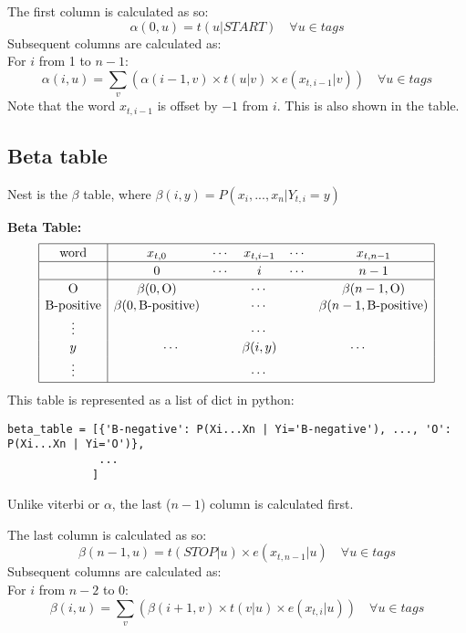 \documentclass[12pt]{article}
\begin{document}
The first column is calculated as so:
\[ \alpha(0,u) = t(u|START) \quad \forall u \in {tags}\]
Subsequent columns are calculated as:\\
For \(i\) from 1 to \(n-1\):
\[ \alpha(i,u) = \sum_v \left( \alpha(i-1,v) \times t(u|v) \times e(x_{t,i-1}|v) \right) \quad \forall u \in {tags}\]
Note that the word \(x_{t,i-1}\) is offset by \(-1\) from \(i\). This is also shown in the table.

\subsection{Beta table}
Nest is the \(\beta\) table, where \(\beta(i,y) = P(x_i,...,x_n | Y_{t,i}=y) \)

\textbf{Beta Table:}
\[
\begin{array}{|c|ccccc|}
\hline \rule{0pt}{1em}
\mbox{word} & x_{t,0} & \cdots & x_{t,i-1} & \cdots & x_{t,n-1} \\
\hline \rule{0pt}{1em}
& 0 & \cdots & i & \cdots & n-1 \\
\hline \rule{0pt}{1em}
\mbox{O}          & \beta(0,\mbox{O}) & \multicolumn{3}{c}{\cdots} & \beta(n-1,\mbox{O}) \\[0.1em]
\mbox{B-positive} & \beta(0,\mbox{B-positive}) & \multicolumn{3}{c}{\cdots} & \beta(n-1,\mbox{B-positive}) \\[0.1em]
\vdots &          & \multicolumn{3}{c}{\cdots} &            \\[0.1em]
y      & \multicolumn{2}{c}{\cdots} & \beta(i,y) & \multicolumn{2}{c|}{\cdots} \\[0.1em]
\vdots &          & \multicolumn{3}{c}{\cdots} &            \\[0.1em]
\hline
\end{array}
\]
This table is represented as a list of dict in python:
\begin{verbatim}
beta_table = [{'B-negative': P(Xi...Xn | Yi='B-negative'), ..., 'O': P(Xi...Xn | Yi='O')},
              ...
             ]
\end{verbatim}

Unlike viterbi or \(\alpha\), the last (\(n-1\)) column is calculated first.

The last column is calculated as so:
\[ \beta(n-1,u) = t(STOP|u) \times e(x_{t,n-1}|u) \quad \forall u \in {tags}\]
Subsequent columns are calculated as:\\
For \(i\) from \(n-2\) to 0:
\[ \beta(i,u) = \sum_v \left( \beta(i+1,v) \times t(v|u) \times e(x_{t,i}|u) \right) \quad \forall u \in {tags} \]
\end{document}
